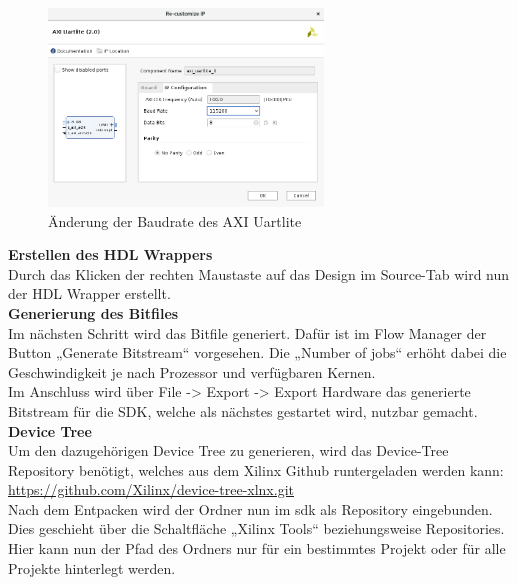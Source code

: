 \begin{figure}[H]
\centering
\includegraphics[width=0.65\textwidth]{Hauptteil/Schritt10.png}
\caption{Änderung der Baudrate des AXI Uartlite}\label{fig:mbschritt10}
\end{figure}

\vspace{10mm}

\textbf{Erstellen des HDL Wrappers}\\

Durch das Klicken der rechten Maustaste auf das Design im Source-Tab wird nun der HDL Wrapper erstellt.\\

\textbf{Generierung des Bitfiles}\\

Im nächsten Schritt wird das Bitfile generiert. Dafür ist im Flow Manager der Button „Generate Bitstream“ vorgesehen.
 Die „Number of jobs“ erhöht dabei die Geschwindigkeit je nach Prozessor und verfügbaren Kernen.\\
 Im Anschluss wird über File -> Export -> Export Hardware das generierte Bitstream für die SDK, welche als nächstes gestartet wird, nutzbar gemacht.\\


\textbf{Device Tree}\\

Um den dazugehörigen Device Tree zu generieren, wird das Device-Tree
 Repository benötigt, welches aus dem Xilinx Github runtergeladen werden kann: \url{https://github.com/Xilinx/device-tree-xlnx.git}\\
Nach dem Entpacken wird der Ordner nun im \ac{sdk} als Repository eingebunden.
 Dies geschieht über die Schaltfläche „Xilinx Tools“ beziehungsweise Repositories.
  Hier kann nun der Pfad des Ordners nur für ein bestimmtes Projekt oder für alle Projekte hinterlegt werden.\\

